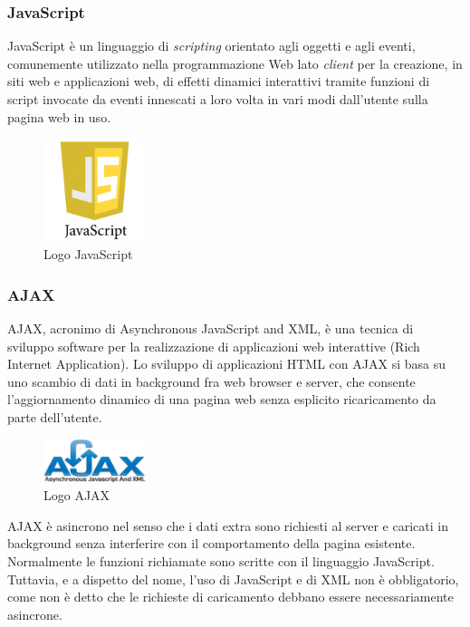 \subsubsection{JavaScript}
JavaScript è un linguaggio di \textit{scripting} orientato agli oggetti e agli eventi, comunemente utilizzato nella programmazione Web lato \textit{client} per la creazione, in siti web e applicazioni web, di effetti dinamici interattivi tramite funzioni di script invocate da eventi innescati a loro volta in vari modi dall'utente sulla pagina web in uso.
\begin{figure}[!h] 
    \centering 
    \includegraphics[height=3cm]{immagini/loghi/javascript.png}
    \caption{Logo JavaScript}
\end{figure}

\subsubsection{AJAX}
AJAX, acronimo di Asynchronous JavaScript and XML, è una tecnica di sviluppo software per la realizzazione di applicazioni web interattive (Rich Internet Application). Lo sviluppo di applicazioni HTML con AJAX si basa su uno scambio di dati in background fra web browser e server, che consente l'aggiornamento dinamico di una pagina web senza esplicito ricaricamento da parte dell'utente.
\begin{figure}[!h] 
    \centering 
    \includegraphics[width=3cm]{immagini/loghi/ajax.png}
    \caption{Logo AJAX}
\end{figure}
AJAX è asincrono nel senso che i dati extra sono richiesti al server e caricati in background senza interferire con il comportamento della pagina esistente. Normalmente le funzioni richiamate sono scritte con il linguaggio JavaScript. Tuttavia, e a dispetto del nome, l'uso di JavaScript e di XML non è obbligatorio, come non è detto che le richieste di caricamento debbano essere necessariamente asincrone.

